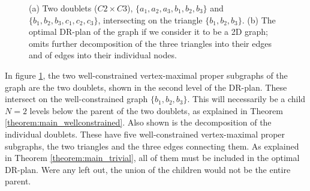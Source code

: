 \begin{figure*}
\begin{subfigure}{.7\linewidth}

    \caption{}
\end{subfigure}

\caption{(a) Two doublets ($C2\times C3$), $\{a_1,a_2,a_3,b_1,b_2,b_3\}$ and $\{b_1,b_2,b_3,c_1,c_2,c_3\}$, intersecting on the triangle $\{b_1,b_2,b_3\}$. (b) The optimal DR-plan of the graph if we consider it to be a 2D graph; omits further decomposition of the three triangles into their edges and of edges into their individual nodes.}
\label{doublets}
\end{figure*}



\begin{example}
    In figure \ref{doublets}, the two well-constrained vertex-maximal proper subgraphs of the graph are the two doublets, shown in the second level of the DR-plan. These intersect on the well-constrained graph $\{b_1,b_2,b_3\}$. This will necessarily be a child $N=2$ levels below the parent of the two doublets, as explained in Theorem \ref{theorem:main_wellconstrained}. Also shown is the decomposition of the individual doublets. These have five well-constrained vertex-maximal proper subgraphs, the two triangles and the three edges connecting them. As explained in Theorem \ref{theorem:main_trivial}, all of them must be included in the optimal DR-plan. Were any left out, the union of the children would not be the entire parent.
\end{example}



